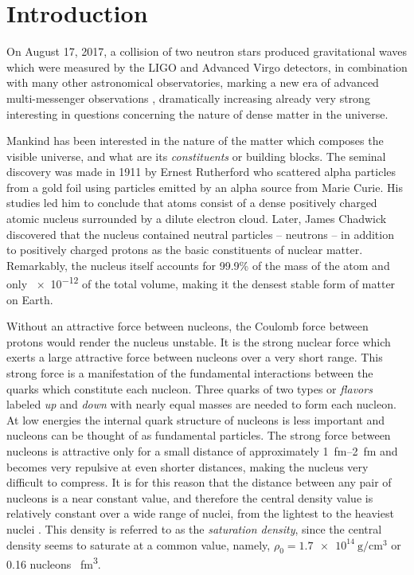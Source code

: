 \chapter{Introduction}
On August 17, 2017, a collision of two  neutron stars produced gravitational waves which were measured by the LIGO and Advanced Virgo detectors, in combination with many other astronomical observatories, marking a new era of advanced multi-messenger observations \cite{ns_2017}, dramatically increasing already very strong interesting in  questions concerning the nature of dense matter in the universe.

Mankind has been interested in the nature of the matter which composes the visible universe, and what are its \emph{constituents} or building blocks. The seminal discovery was made in 1911 by Ernest Rutherford who scattered alpha particles from a gold foil using particles emitted by an alpha source from Marie Curie. His studies led him to conclude that atoms consist of a dense positively charged atomic nucleus surrounded by a dilute electron cloud. Later,  James Chadwick  discovered that the nucleus contained neutral particles -- neutrons  -- in addition to positively charged protons as the basic constituents of nuclear matter. Remarkably, the nucleus itself accounts for 99.9\% of the mass of the atom and only \num{e-12} of the total volume, making it the densest stable form of matter on Earth. 

Without an attractive force between nucleons, the Coulomb force between protons would render the nucleus unstable. It is the strong nuclear force which exerts a large attractive force  between nucleons over a very short range. This strong force is a manifestation of the fundamental interactions between the quarks which constitute each nucleon. Three quarks of two types or \emph{flavors} labeled \emph{up} and \emph{down} with nearly equal masses are needed to form each nucleon. At low energies the internal quark structure of nucleons is less important and nucleons can be thought of as fundamental particles. The strong force between nucleons is attractive only for a small distance of approximately \SIrange{1}{2}{\femto\metre} and becomes very repulsive at even shorter distances, making the nucleus very difficult to compress. It is for this reason that the distance between any pair of nucleons is a near constant value, and therefore the central density value is relatively constant over a wide range of nuclei, from the lightest to the heaviest nuclei \cite{krane}. This density is referred to as the  \emph{saturation density}, since the central density seems to saturate at a common value, namely, $\rho_0 = \SI{1.7e14}{\gram\per\centi\metre\cubed}$ or \num{0.16} nucleons \si{\per\femto\metre\cubed}.  

